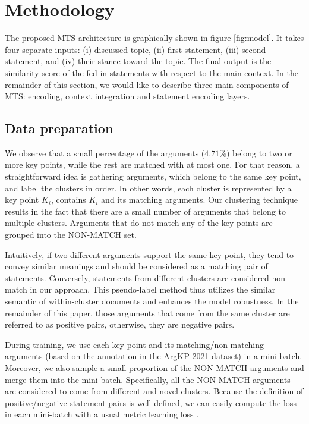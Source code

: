 \section{Methodology}
\label{sec:method}

The proposed MTS architecture is graphically shown in figure \ref{fig:model}. It takes four separate inputs: (i) discussed topic, (ii) first statement, (iii) second statement, and (iv) their stance toward the topic. The final output is the similarity score of the fed in statements with respect to the main context. In the remainder of this section, we would like to describe three main components of MTS: encoding, context integration and statement encoding layers.

\subsection{Data preparation}
\label{sec:prepare}
We observe that a small percentage of the arguments ($4.71\%$) belong to two or more key points, while the rest are matched with at most one. For that reason, a straightforward idea is gathering arguments, which belong to the same key point, and label the clusters in order. In other words, each cluster is represented by a key point $K_i$, contains $K_i$ and its matching arguments. Our clustering technique results in the fact that there are a small number of arguments that belong to multiple clusters. Arguments that do not match any of the key points are grouped into the NON-MATCH set.

Intuitively, if two different arguments support the same key point, they tend to convey similar meanings and should be considered as a matching pair of statements. Conversely, statements from different clusters are considered non-match in our approach. This pseudo-label method thus utilizes the similar semantic of within-cluster documents and enhances the model robustness. In the remainder of this paper, those arguments that come from the same cluster are referred to as positive pairs, otherwise, they are negative pairs.

During training, we use each key point and its matching/non-matching arguments (based on the annotation in the ArgKP-2021 dataset) in a mini-batch. Moreover, we also sample a small proportion of the NON-MATCH arguments and merge them into the mini-batch. Specifically, all the NON-MATCH arguments are considered to come from different and novel clusters. Because the definition of positive/negative statement pairs is well-defined, we can easily compute the loss in each mini-batch with a usual metric learning loss \citep{chopra2005learning, yu2019deep}.%

